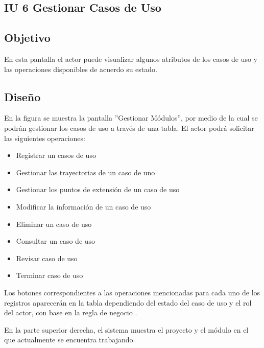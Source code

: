 \subsection{IU 6 Gestionar Casos de Uso}

\subsection{Objetivo}
	En esta pantalla el actor puede visualizar algunos atributos de los casos de uso y las operaciones disponibles de acuerdo su estado.
\subsection{Diseño}
	En la figura  se muestra la pantalla ''Gestionar Módulos'', por medio de la cual se podrán gestionar los casos de uso a través de una tabla. El actor podrá solicitar las siguientes operaciones:
	\begin{itemize}
		\item Registrar un casos de uso
		\item Gestionar las trayectorias de un caso de uno
		\item Gestionar los puntos de extensión de un caso de uso
		\item Modificar la información de un caso de uso
		\item Eliminar un caso de uso
		\item Consultar un caso de uso
		\item Revisar caso de uso
		\item Terminar caso de uso
	\end{itemize}

Los botones correspondientes a las operaciones mencionadas para cada uno de los registros aparecerán en la tabla dependiendo del estado del caso de uso y el rol del actor, con base en la regla de negocio .

En la parte superior derecha, el sistema muestra el proyecto y el módulo en el que actualmente se encuentra trabajando.
\label{IU6}
